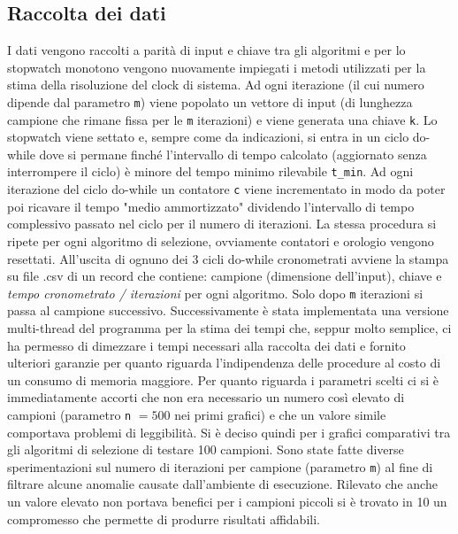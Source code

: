 \documentclass{article}
\begin{document}
\subsection{Raccolta dei dati}
I dati vengono raccolti a parità di input e chiave tra gli algoritmi e per lo stopwatch monotono vengono nuovamente impiegati i metodi utilizzati per la stima della risoluzione del clock di sistema.
\newline
\newline
Ad ogni iterazione (il cui numero dipende dal parametro \texttt{m}) viene popolato un vettore di input (di lunghezza campione che rimane fissa per le \texttt{m} iterazioni) e viene generata una chiave \texttt{k}.
\newline
Lo stopwatch viene settato e, sempre come da indicazioni, si entra in un ciclo do-while dove si permane finché l'intervallo di tempo calcolato (aggiornato senza interrompere il ciclo) è minore del tempo minimo rilevabile \texttt{t_min}.
\newline
\newline
Ad ogni iterazione del ciclo do-while un contatore \texttt{c} viene incrementato in modo da poter poi ricavare il tempo "medio ammortizzato" dividendo l'intervallo di tempo complessivo passato nel ciclo per il numero di iterazioni.
\newline
La stessa procedura si ripete per ogni algoritmo di selezione, ovviamente contatori e orologio vengono resettati.
\newline
\newline
All'uscita di ognuno dei 3 cicli do-while cronometrati avviene la stampa su file .csv di un record che contiene: campione (dimensione dell'input), chiave e \textit{tempo cronometrato / iterazioni} per ogni algoritmo.
\newline
Solo dopo \texttt{m} iterazioni si passa al campione successivo.
\newline
\newline
Successivamente è stata implementata una versione multi-thread del programma per la stima dei tempi che, seppur molto semplice, ci ha permesso di dimezzare i tempi necessari alla raccolta dei dati e fornito ulteriori garanzie per quanto riguarda l'indipendenza delle procedure al costo di un consumo di memoria maggiore.
\newline
\newline
Per quanto riguarda i parametri scelti ci si è immediatamente accorti che non era necessario un numero così elevato di campioni (parametro \texttt{n} $= 500$ nei primi grafici) e che un valore simile comportava problemi di leggibilità.
\newline
Si è deciso quindi per i grafici comparativi tra gli algoritmi di selezione di testare 100 campioni.
\newline
\newline
Sono state fatte diverse sperimentazioni sul numero di iterazioni per campione (parametro \texttt{m}) al fine di filtrare alcune anomalie causate dall'ambiente di esecuzione. Rilevato che anche un valore elevato non portava benefici per i campioni piccoli si è trovato in 10 un compromesso che permette di produrre risultati affidabili.
\end{document}
